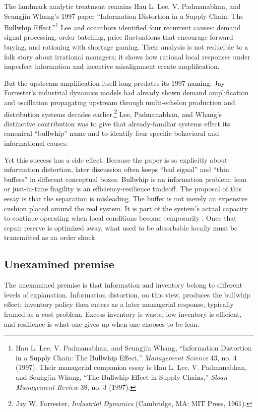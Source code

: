 \documentclass[11pt]{article}
\begin{document}
The landmark analytic treatment remains Hau L. Lee, V. Padmanabhan, and Seungjin Whang's 1997 paper ``Information Distortion in a Supply Chain: The Bullwhip Effect.''\footnote{Hau L. Lee, V. Padmanabhan, and Seungjin Whang, ``Information Distortion in a Supply Chain: The Bullwhip Effect,'' \emph{Management Science} 43, no. 4 (1997). Their managerial companion essay is Hau L. Lee, V. Padmanabhan, and Seungjin Whang, ``The Bullwhip Effect in Supply Chains,'' \emph{Sloan Management Review} 38, no. 3 (1997).} Lee and coauthors identified four recurrent causes: demand signal processing, order batching, price fluctuations that encourage forward buying, and rationing with shortage gaming. Their analysis is not reducible to a folk story about irrational managers; it shows how rational local responses under imperfect information and incentive misalignment create amplification.

But the upstream amplification itself long predates its 1997 naming. Jay Forrester's industrial dynamics models had already shown demand amplification and oscillation propagating upstream through multi-echelon production and distribution systems decades earlier.\footnote{Jay W. Forrester, \emph{Industrial Dynamics} (Cambridge, MA: MIT Press, 1961).} Lee, Padmanabhan, and Whang's distinctive contribution was to give that already-familiar systems effect its canonical ``bullwhip'' name and to identify four specific behavioral and informational causes.

Yet this success has a side effect. Because the paper is so explicitly about information distortion, later discussion often keeps ``bad signal'' and ``thin buffers'' in different conceptual boxes. Bullwhip is an information problem; lean or just-in-time fragility is an efficiency-resilience tradeoff. The proposal of this essay is that the separation is misleading. The buffer is not merely an expensive cushion placed around the real system. It is part of the system's actual capacity to continue operating when local conditions become temporarily \inadmissible. Once that repair reserve is optimized away, what used to be absorbable locally must be transmitted as an order shock.

\subsection*{Unexamined premise}
The unexamined premise is that information and inventory belong to different levels of explanation. Information distortion, on this view, produces the bullwhip effect; inventory policy then enters as a later managerial response, typically framed as a cost problem. Excess inventory is waste, low inventory is efficient, and resilience is what one gives up when one chooses to be lean.
\end{document}
